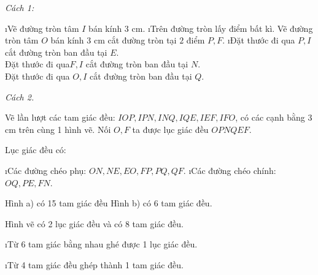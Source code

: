 \begin{Answer}{61}
		\textit{Cách 1:}
		\begin{enumerate}[Bước 1:, leftmargin=*]
			\i Vẽ đường tròn tâm $I$  bán kính $3$ cm.
			\i Trên đường tròn lấy điểm  bất kì. Vẽ đường tròn tâm $O$ bán kính $3$ cm cắt đường tròn tại $2$ điểm $P, F$.
			\i Đặt thước đi qua $P,I$ cắt đường tròn ban đầu tại $E$.\\
			Đặt thước đi qua$F,I$  cắt đường tròn ban đầu tại $N$.\\
			Đặt thước đi qua $O,I$ cắt đường tròn ban đầu tại $Q$.
		\end{enumerate}
		\textit{Cách 2.}
		
		Vẽ lần lượt các tam giác đều: $IOP, IPN, INQ, IQE, IEF, IFO$, có các cạnh bằng 3 cm trên cùng 1 hình vẽ. Nối $O,F$ ta được lục giác đều $OPNQEF$.
		
		Lục giác đều  có:
		\begin{enumerate}[--, leftmargin=*]
			\i Các đường chéo phụ: $ON, NE, EO, FP, PQ, QF$.
			\i Các đường chéo chính: $OQ, PE, FN$.
		\end{enumerate}
	
\end{Answer}
\begin{Answer}{62}
		Hình a) có 15 tam giác đều
		Hình b) có 6 tam giác đều.
	
\end{Answer}
\begin{Answer}{63}
		Hình vẽ có 2 lục giác đều và có 8 tam giác đều.
	
\end{Answer}
\begin{Answer}{64}
		\begin{enumerate}[a), leftmargin=*]
			\i Từ 6 tam giác bằng nhau ghé được 1 lục giác đều.
			
			\i Từ 4 tam giác đều ghép thành 1 tam giác đều.

		\end{enumerate}
	
\end{Answer}
